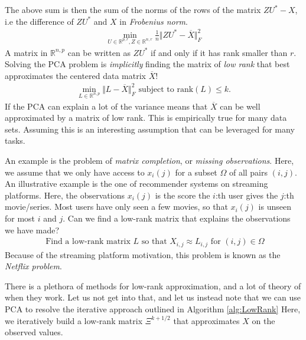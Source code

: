 \documentclass{article}
\newcommand{\R}{\mathbb{R}}
\newcommand{\norm}[1]{\Vert #1 \Vert}
\begin{document}
 The above sum is then the sum of the norms of the rows of the matrix $ZU^*-X$, i.e the difference of $ZU^*$ and $X$ in \emph{Frobenius norm}.
 \begin{align*}
     \min_{U \in \R^{p,r}, Z\in \R^{n,r}} \tfrac{1}{n}\norm{ZU^*-\overline{X}}_F^2
 \end{align*}
 A matrix in $\R^{n,p}$ can be written as $ZU^*$ if and only if it has rank smaller than $r$. Solving the PCA problem is \emph{implicitly} finding the matrix of \emph{low rank} that best approximates the centered data matrix $\overline{X}$!
 \begin{align*}
     \min_{L \in \R^{n,p}} \norm{L-\overline{X}}_F^2 \text{ subject to $\mathrm{rank}(L)\leq k$.}
 \end{align*}
 If the PCA can explain a lot of the variance means that $\overline{X}$ can be well approximated by a matrix of low rank. This is empirically true for many data sets. Assuming this is an interesting assumption that can be leveraged for many tasks.

 An example is the problem of \emph{matrix completion}, or \emph{missing observations}. Here, we assume that we only have access to $x_i(j)$ for a subset $\Omega$ of all pairs $(i,j)$. An illustrative example is the one of recommender systems on streaming platforms. Here, the observations $x_i(j)$ is the score the $i$:th user gives the $j$:th movie/series. Most users have only seen a few movies, so that $x_i(j)$ is unseen for most $i$ and $j$. Can we find a low-rank matrix that explains the observations we have made?
 \begin{align*}
    \text{ Find a low-rank matrix $L$ so that } X_{i,j} \approx L_{i,j} \text{ for } (i,j) \in \Omega
 \end{align*}
 Because of the streaming platform motivation, this problem is known as the \emph{Netflix problem}.

 There is a plethora of methods for low-rank approximation, and a lot of theory of when they work. Let us not get into that, and let us instead note that we can use PCA to resolve the iterative approach outlined in Algorithm \ref{alg:LowRank} Here, we iteratively build a low-rank matrix $\Xi^{k+1/2}$ that approximates $X$ on the observed values.  
\end{document}
